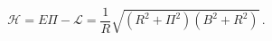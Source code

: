 \begin{equation}
  \mathcal{H}=E\Pi- \mathcal{L}=
\frac{1}{R}\sqrt{(R^2+\Pi ^2)(B^2+R^2)}\,.
 \label{valueH}
\end{equation}

